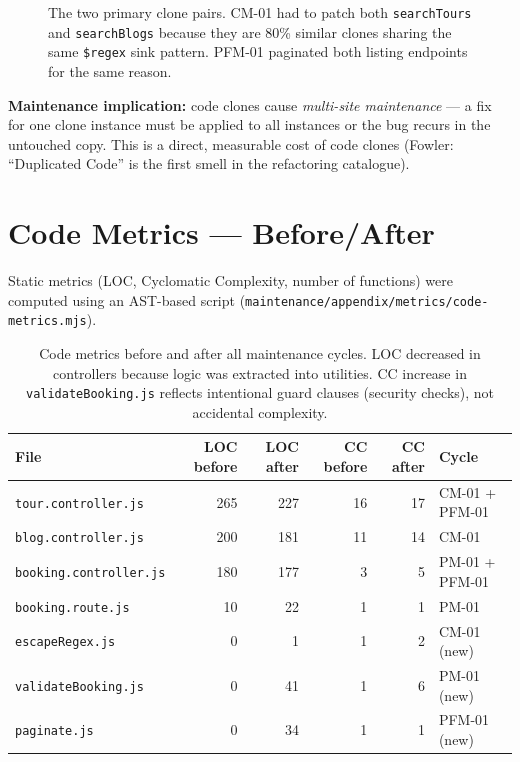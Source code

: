 \documentclass[11pt,a4paper]{article}
\begin{document}
\begin{figure}[H]
\caption{The two primary clone pairs. CM-01 had to patch both \texttt{searchTours} and
  \texttt{searchBlogs} because they are 80\% similar clones sharing the same
  \texttt{\$regex} sink pattern. PFM-01 paginated both listing endpoints for the same reason.}
\label{fig:clones}
\end{figure}

\noindent\textbf{Maintenance implication:} code clones cause \emph{multi-site maintenance} ---
a fix for one clone instance must be applied to all instances or the bug recurs in the
untouched copy. This is a direct, measurable cost of code clones (Fowler: ``Duplicated Code''
is the first smell in the refactoring catalogue).

\newpage
\section{Code Metrics --- Before/After}

Static metrics (LOC, Cyclomatic Complexity, number of functions) were computed using
an AST-based script (\texttt{maintenance/appendix/metrics/code-metrics.mjs}).

\begin{table}[H]
\centering\small
\begin{tabular}{@{}lrrrrl@{}}
\toprule
\textbf{File} & \textbf{LOC before} & \textbf{LOC after} &
\textbf{CC before} & \textbf{CC after} & \textbf{Cycle} \\
\midrule
\texttt{tour.controller.js}    & 265 & 227 & 16 & 17 & CM-01 + PFM-01 \\
\texttt{blog.controller.js}    & 200 & 181 & 11 & 14 & CM-01 \\
\texttt{booking.controller.js} & 180 & 177 &  3 &  5 & PM-01 + PFM-01 \\
\texttt{booking.route.js}      &  10 &  22 &  1 &  1 & PM-01 \\
\texttt{escapeRegex.js}        &   0 &   1 &  1 &  2 & CM-01 (new) \\
\texttt{validateBooking.js}    &   0 &  41 &  1 &  6 & PM-01 (new) \\
\texttt{paginate.js}           &   0 &  34 &  1 &  1 & PFM-01 (new) \\
\bottomrule
\end{tabular}
\caption{Code metrics before and after all maintenance cycles.
  LOC decreased in controllers because logic was extracted into utilities.
  CC increase in \texttt{validateBooking.js} reflects intentional guard clauses
  (security checks), not accidental complexity.}
\end{table}
\end{document}

